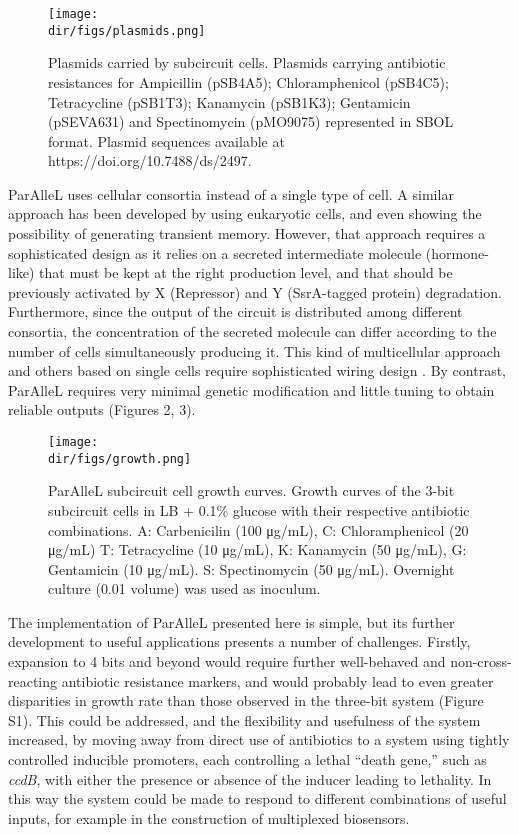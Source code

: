 \begin{figure}[htbp]
  \centering
  \texttt{[image: \\dir/figs/plasmids.png]}
  \caption{Plasmids carried by subcircuit cells. Plasmids carrying antibiotic resistances for Ampicillin (pSB4A5); Chloramphenicol (pSB4C5); Tetracycline (pSB1T3); Kanamycin (pSB1K3); Gentamicin (pSEVA631) and Spectinomycin (pMO9075) represented in SBOL format. Plasmid sequences available at https://doi.org/10.7488/ds/2497.}
  \label{fig.example}
\end{figure}

ParAlleL uses cellular consortia instead of a single type of cell. A similar approach has been developed by \cite{macia2016implementation,macia2016implementation} using eukaryotic cells, and even showing the possibility of generating transient memory. However, that approach requires a sophisticated design as it relies on a secreted intermediate molecule (hormone-like) that must be kept at the right production level, and that should be previously activated by X (Repressor) and Y (SsrA-tagged protein) degradation. Furthermore, since the output of the circuit is distributed among different consortia, the concentration of the secreted molecule can differ according to the number of cells simultaneously producing it. This kind of multicellular approach and others based on single cells require sophisticated wiring design \cite{silva2008mining,siuti2013synthetic,macia2016implementation,macia2017synthetic}. By contrast, ParAlleL requires very minimal genetic modification and little tuning to obtain reliable outputs (Figures 2, 3).

\begin{figure}[htbp]
  \centering
  \texttt{[image: \\dir/figs/growth.png]}
  \caption{ParAlleL subcircuit cell growth curves. Growth curves of the 3-bit subcircuit cells in LB + 0.1\% glucose with their respective antibiotic combinations. A: Carbenicilin (100 μg/mL), C: Chloramphenicol (20 μg/mL) T: Tetracycline (10 μg/mL), K: Kanamycin (50 μg/mL), G:
Gentamicin (10 μg/mL). S: Spectinomycin (50 μg/mL). Overnight culture (0.01 volume) was used as inoculum.}
  \label{fig.example}
\end{figure}


The implementation of ParAlleL presented here is simple, but its further development to useful applications presents a number of challenges. Firstly, expansion to 4 bits and beyond would require further well-behaved and non-cross-reacting antibiotic resistance markers, and would probably lead to even greater disparities in growth rate than those observed in the three-bit system (Figure S1). This could be addressed, and the flexibility and usefulness of the system increased, by moving away from direct use of antibiotics to a system using tightly controlled inducible promoters, each controlling a lethal “death gene,” such as \textit{ccdB}, with either the presence or absence of the inducer leading to lethality. In this way the system could be made to respond to different combinations of useful inputs, for example in the construction of multiplexed biosensors.

